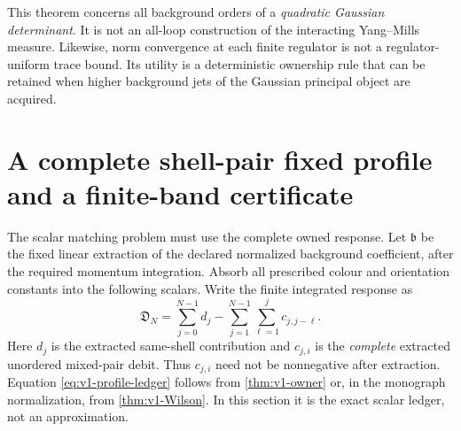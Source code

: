 \documentclass[11pt,a4paper]{article}
\theoremstyle{definition}
\theoremstyle{remark}
\newcommand{\bext}{\mathfrak b}
\begin{document}
This theorem concerns all background orders of a \emph{quadratic
Gaussian determinant}. It is not an all-loop construction of the
interacting Yang--Mills measure. Likewise, norm convergence at each
finite regulator is not a regulator-uniform trace bound. Its utility
is a deterministic ownership rule that can be retained when higher
background jets of the Gaussian principal object are acquired.

\section{A complete shell-pair fixed profile and a finite-band certificate}
\label{sec:v1-profile}

The scalar matching problem must use the complete owned response.
Let $\bext$ be the fixed linear extraction of the declared normalized
background coefficient, after the required momentum integration. Absorb
all prescribed colour and orientation constants into the following
scalars. Write the finite integrated response as
\begin{equation}\label{eq:v1-profile-ledger}
 \mathfrak D_N=\sum_{j=0}^{N-1}d_j
                    -\sum_{j=1}^{N-1}\sum_{\ell=1}^j c_{j,j-\ell}.
\end{equation}
Here $d_j$ is the extracted same-shell contribution and $c_{j,i}$ is the
\emph{complete} extracted unordered mixed-pair debit. Thus $c_{j,i}$
need not be nonnegative after extraction. Equation
\cref{eq:v1-profile-ledger} follows from \cref{thm:v1-owner} or, in the
monograph normalization, from \cref{thm:v1-Wilson}. In this section it is
the exact scalar ledger, not an approximation.
\end{document}
